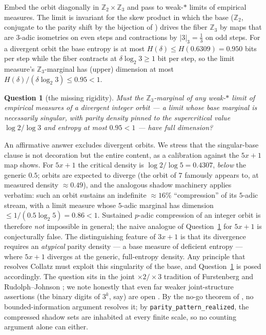 \documentclass[11pt]{article}
\newtheorem{question}[theorem]{Question}
\newcommand{\Z}{\mathbb{Z}}
\newcommand{\Ztwo}{\Z_2}
\newcommand{\Zthree}{\Z_3}
\newcommand{\code}[1]{\texttt{#1}}
\begin{document}
Embed the orbit diagonally in $\Ztwo \times \Zthree$ and pass to
weak-$*$ limits of empirical measures. The limit is invariant for the
skew product in which the base ($\Ztwo$, conjugate to the parity shift
by the bijection of \cite{companion}) drives the fiber $\Zthree$ by
maps that are $3$-adic isometries on even steps and contractions by
$|3|_3 = \tfrac13$ on odd steps. For a divergent orbit the base
entropy is at most $H(\delta) \le H(0.6309) = 0.950$ bits per step
while the fiber contracts at $\delta \log_2 3 \ge 1$ bit per step, so
the limit measure's $\Zthree$-marginal has (upper) dimension at most
$H(\delta)/(\delta \log_2 3) \le 0.95 < 1$.

\begin{question}[the missing rigidity]\label{q:R}
Must the $\Zthree$-marginal of any weak-$*$ limit of empirical
measures of a divergent \emph{integer} orbit --- a limit whose
\emph{base marginal is necessarily singular}, with parity density
pinned to the supercritical value $\log 2/\log 3$ and entropy at most
$0.95 < 1$ --- have full dimension?
\end{question}

An affirmative answer excludes divergent orbits. We stress that the
singular-base clause is not decoration but the entire content, as a
calibration against the $5x+1$ map shows. For $5x+1$ the critical
density is $\log 2/\log 5 = 0.4307$, \emph{below} the generic $0.5$;
orbits are expected to diverge (the orbit of $7$ famously appears to,
at measured density $\approx 0.49$), and the analogous shadow
machinery applies verbatim: such an orbit sustains an indefinite
$\approx 16\%$ ``compression'' of its $5$-adic stream, with a limit
measure whose $5$-adic marginal has dimension
$\le 1/(0.5 \log_2 5) = 0.86 < 1$. Sustained $p$-adic compression of
an integer orbit is therefore \emph{not} impossible in general; the
naive analogue of Question~\ref{q:R} for $5x+1$ is conjecturally
false. The distinguishing feature of $3x+1$ is that its divergence
requires an \emph{atypical} parity density --- a base measure of
deficient entropy --- where $5x+1$ diverges at the generic,
full-entropy density. Any principle that resolves Collatz must
exploit this singularity of the base, and Question~\ref{q:R} is posed
accordingly. The question sits in the joint $\times 2/\times 3$
tradition of Furstenberg \cite{furstenberg} and Rudolph--Johnson
\cite{rudolph}; we note honestly that even far weaker joint-structure
assertions (the binary digits of $3^k$, say) are open
\cite{senge-straus, stewart}. By the no-go theorem of
\cite{companion}, no bounded-information argument resolves it; by
\code{parity\_pattern\_realized}, the compressed shadow sets are
inhabited at every finite scale, so no counting argument alone can
either.
\end{document}

